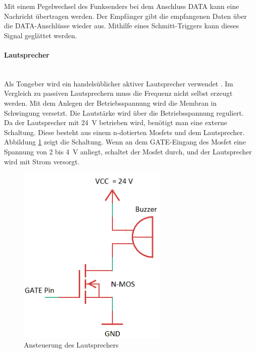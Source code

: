 Mit einem Pegelwechsel des Funksenders bei dem Anschluss \si{DATA} kann eine Nachricht übertragen werden. Der Empfänger gibt die empfangenen Daten über die \si{DATA}-Anschlüsse wieder aus. Mithilfe eines Schmitt-Triggers kann dieses Signal geglättet werden.

\paragraph{Lautsprecher}\mbox{}\\
Als Tongeber wird ein handelsüblicher aktiver Lautsprecher verwendet \cite{src_LAUTSPRECHER}. Im Vergleich zu passiven Lautsprechern muss die Frequenz nicht selbst erzeugt werden. Mit dem Anlegen der Betriebsspannung wird die Membran in Schwingung versetzt. Die Lautstärke wird über die Betriebsspannung reguliert. Da der Lautsprecher mit \SI{24}{\volt} betrieben wird, benötigt man eine externe Schaltung. Diese besteht aus einem n-dotierten Mosfets und dem Lautsprecher. Abbildung \ref{img:schaltung} zeigt die Schaltung. Wenn an dem \si{GATE}-Eingang des Mosfet eine Spannung von \si{2} bis \SI{4}{\volt} anliegt, schaltet der Mosfet durch, und der Lautsprecher wird mit Strom versorgt.

\begin{figure}[H]
        \centering
		\hspace*{-1.5cm}
        \includegraphics[width=0.65\textwidth]{images/schaltung.png}
        \caption{Ansteuerung des Lautsprechers}
        \label{img:schaltung}
\end{figure}


